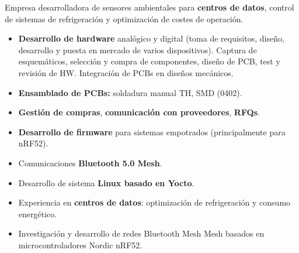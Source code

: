 \documentclass[10pt,a4paper,ragged2e,withhyper]{altacv}
\begin{document}
\begin{paracol}{2}


Empresa desarrolladora de sensores ambientales para \textbf{centros de datos}, control de sistemas de refrigeración y optimización de costes de operación.

\begin{itemize}
\item \textbf{Desarrollo de hardware} analógico y digital (toma de requisitos, diseño, desarrollo y puesta en mercado de varios dispositivos). Captura de esquemáticos, selección y compra de componentes, diseño de PCB, test y revisión de HW. Integración de PCBs en diseños mecánicos.
\item \textbf{Ensamblado de PCBs:} soldadura manual TH, SMD (0402).
\item \textbf{Gestión de compras}, \textbf{comunicación con proveedores}, \textbf{RFQs}.
\item \textbf{Desarrollo de firmware} para sistemas empotrados (principalmente para nRF52).
\item Comunicaciones \textbf{Bluetooth 5.0 Mesh}.
\item Desarrollo de sistema \textbf{Linux basado en Yocto}.
\item Experiencia en \textbf{centros de datos}: optimización de refrigeración y consumo energético.
\end{itemize}

\divider

\begin{itemize}
\item Investigación y desarrollo de redes Bluetooth Mesh Mesh basados en microcontroladores Nordic nRF52.
\end{itemize}





\end{paracol}
\end{document}
